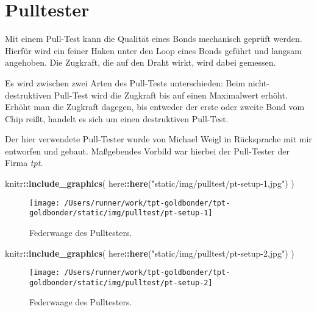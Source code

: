 \documentclass[
  paper=a4,
  ,captions=tableheading
]{scrartcl}
\newenvironment{Shaded}{\begin{snugshade}}{\end{snugshade}}
\newcommand{\KeywordTok}[1]{\textcolor[rgb]{0.13,0.29,0.53}{\textbf{#1}}}
\newcommand{\NormalTok}[1]{#1}
\newcommand{\OperatorTok}[1]{\textcolor[rgb]{0.81,0.36,0.00}{\textbf{#1}}}
\newcommand{\StringTok}[1]{\textcolor[rgb]{0.31,0.60,0.02}{#1}}
\begin{document}
\hypertarget{pt-pulltester}{%
\section{Pulltester}\label{pt-pulltester}}

Mit einem Pull-Test kann die Qualität eines Bonds mechanisch geprüft werden. Hierfür wird ein feiner Haken unter den Loop eines Bonds geführt und langsam angehoben. Die Zugkraft, die auf den Draht wirkt, wird dabei gemessen.

Es wird zwischen zwei Arten des Pull-Tests unterschieden: Beim nicht-destruktiven Pull-Test wird die Zugkraft bis auf einen Maximalwert erhöht. Erhöht man die Zugkraft dagegen, bis entweder der erste oder zweite Bond vom Chip reißt, handelt es sich um einen destruktiven Pull-Test.

Der hier verwendete Pull-Tester wurde von Michael Weigl in Rücksprache mit mir entworfen und gebaut. Maßgebendes Vorbild war hierbei der Pull-Tester der Firma \emph{tpt}.

\begin{Shaded}
\begin{Highlighting}[]
\NormalTok{knitr}\OperatorTok{::}\KeywordTok{include_graphics}\NormalTok{(}
\NormalTok{  here}\OperatorTok{::}\KeywordTok{here}\NormalTok{(}\StringTok{"static/img/pulltest/pt-setup-1.jpg"}\NormalTok{)}
\NormalTok{)}
\end{Highlighting}
\end{Shaded}

\begin{figure}

{\centering \texttt{[image: /Users/runner/work/tpt-goldbonder/tpt-goldbonder/static/img/pulltest/pt-setup-1]} 

}

\caption{Federwaage des Pulltesters. }\label{fig:pt-setup-1}
\end{figure}

\begin{Shaded}
\begin{Highlighting}[]
\NormalTok{knitr}\OperatorTok{::}\KeywordTok{include_graphics}\NormalTok{(}
\NormalTok{  here}\OperatorTok{::}\KeywordTok{here}\NormalTok{(}\StringTok{"static/img/pulltest/pt-setup-2.jpg"}\NormalTok{)}
\NormalTok{)}
\end{Highlighting}
\end{Shaded}

\begin{figure}

{\centering \texttt{[image: /Users/runner/work/tpt-goldbonder/tpt-goldbonder/static/img/pulltest/pt-setup-2]} 

}

\caption{Federwaage des Pulltesters. }\label{fig:pt-setup-2}
\end{figure}
\end{document}
